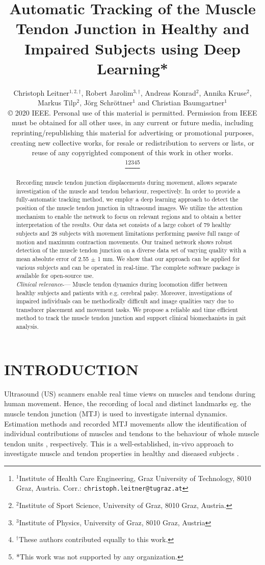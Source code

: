 \documentclass[letterpaper, 10 pt, conference]{ieeeconf}
\title{\bf \large{Automatic Tracking of the Muscle Tendon Junction in Healthy and Impaired Subjects using Deep Learning*}}
\author{\parbox{15cm}{\centering \small{Christoph Leitner$^{1,2,\dagger}$, Robert Jarolim$^{3,\dagger}$, Andreas Konrad$^{2}$, Annika Kruse$^{2}$, Markus Tilp$^{2}$, J\"org Schr\"ottner$^{1}$ and Christian Baumgartner$^{1}$}\\
\tiny{© 2020 IEEE. Personal use of this material is permitted. Permission from IEEE must be obtained for all other uses, in any current or future media, including reprinting/republishing this material for advertising or promotional purposes, creating new collective works, for resale or redistribution to servers or lists, or reuse of any copyrighted component of this work in other works.}
}
\thanks{$^{1}$Institute of Health Care Engineering, Graz University of Technology, 8010 Graz, Austria. Corr.: {\tt\small christoph.leitner@tugraz.at}}\thanks{$^{2}$Institute of Sport Science, University of Graz, 8010 Graz, Austria.}\thanks{$^{3}$Institute of Physics, University of Graz, 8010 Graz, Austria}\thanks{$^{\dagger}$These authors contributed equally to this work.}\thanks{*This work was not supported by any organization.}}
\begin{document}
\maketitle
\thispagestyle{empty}
\pagestyle{empty}


\begin{abstract}
Recording muscle tendon junction displacements during movement, allows separate investigation of the muscle and tendon behaviour, respectively. In order to provide a fully-automatic tracking method, we employ a deep learning approach to detect the position of the muscle tendon junction in ultrasound images. We utilize the attention mechanism to enable the network to focus on relevant regions and to obtain a better interpretation of the results. Our data set consists of a large cohort of 79 healthy subjects and 28 subjects with movement limitations performing passive full range of motion and maximum contraction movements. Our trained network shows robust detection of the muscle tendon junction on a diverse data set of varying quality with a mean absolute error of 2.55 $\pm$ 1 mm. We show that our approach can be applied for various subjects and can be operated in real-time. The complete software package is available for open-source use.
\newline
\\
\indent \textit{Clinical relevance}-— Muscle tendon dynamics during locomotion differ between healthy subjects and patients with e.g. cerebral palsy. Moreover, investigations of impaired individuals can be methodically difficult and image qualities vary due to transducer placement and movement tasks. We propose a reliable and time efficient method to track the muscle tendon junction and support clinical biomechanists in gait analysis.
\end{abstract}
\section{INTRODUCTION}
\label{sect:introduction}
Ultrasound (US) scanners enable real time views on muscles and tendons during human movement. Hence, the recording of local and distinct landmarks eg. the muscle tendon junction (MTJ) is used to investigate internal dynamics. Estimation methods and recorded MTJ movements allow the identification of individual contributions of muscles and tendons to the behaviour of whole muscle tendon units \cite{j:Leitner2020}, respectively. This is a well-established, in-vivo approach to investigate muscle and tendon properties in healthy \cite{j:Dick2016} and diseased subjects \cite{j:Barber2017}.
\end{document}
